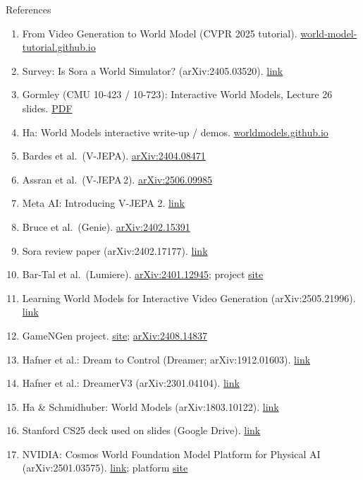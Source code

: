 \begin{frame}[allowframebreaks]{References}
  \setlength{\leftmargini}{1.1em}
  \setlength{\itemsep}{0.09em}
  \begin{enumerate}
    \setlength{\itemsep}{0.07em}
    \item From Video Generation to World Model ({CVPR} 2025 tutorial). \href{https://world-model-tutorial.github.io/}{world-model-tutorial.github.io}
    \item Survey: Is {Sora} a World Simulator? ({arXiv}:2405.03520). \href{https://arxiv.org/abs/2405.03520}{link}
    \item Gormley ({CMU} 10-423 / 10-723): Interactive World Models, Lecture 26 slides. \href{https://www.cs.cmu.edu/~mgormley/courses/10423/slides/lecture26-world-models.pdf}{PDF}
    \item Ha: World Models interactive write-up / demos. \href{https://worldmodels.github.io/}{worldmodels.github.io}
    \item Bardes et al.\ ({V-JEPA}). \href{https://arxiv.org/abs/2404.08471}{arXiv:2404.08471}
    \item Assran et al.\ ({V-JEPA}\,2). \href{https://arxiv.org/abs/2506.09985}{arXiv:2506.09985}
    \item {Meta AI}: Introducing {V-JEPA} 2. \href{https://ai.meta.com/research/vjepa/}{link}
    \item Bruce et al.\ ({Genie}). \href{https://arxiv.org/abs/2402.15391}{arXiv:2402.15391}
    \item {Sora} review paper ({arXiv}:2402.17177). \href{https://arxiv.org/abs/2402.17177}{link}
    \item Bar-Tal et al.\ ({Lumiere}). \href{https://arxiv.org/abs/2401.12945}{arXiv:2401.12945}; project \href{https://lumiere-video.github.io/}{site}
    \item Learning World Models for Interactive Video Generation ({arXiv}:2505.21996). \href{https://arxiv.org/abs/2505.21996}{link}
    \item {GameNGen} project. \href{https://gamengen.github.io/}{site}; \href{https://arxiv.org/abs/2408.14837}{arXiv:2408.14837}
    \item Hafner et al.: Dream to Control ({Dreamer}; {arXiv}:1912.01603). \href{https://arxiv.org/abs/1912.01603}{link}
    \item Hafner et al.: {DreamerV3} ({arXiv}:2301.04104). \href{https://arxiv.org/abs/2301.04104}{link}
    \item Ha \& Schmidhuber: World Models ({arXiv}:1803.10122). \href{https://arxiv.org/abs/1803.10122}{link}
    \item Stanford {CS25} deck used on slides ({Google} Drive). \href{https://drive.google.com/file/d/1bF5Yfzf-FG5iNIAgsXn2DwVD3l3ymvZW/view}{link}
    \item {NVIDIA}: Cosmos World Foundation Model Platform for Physical {AI} ({arXiv}:2501.03575). \href{https://arxiv.org/abs/2501.03575}{link}; platform \href{https://www.nvidia.com/en-us/ai/cosmos/}{site}
  \end{enumerate}
\end{frame}
